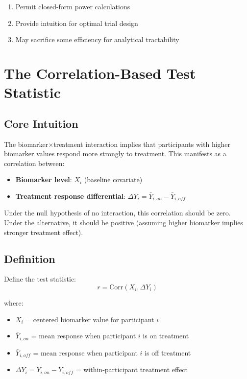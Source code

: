 \documentclass[11pt]{article}
\theoremstyle{definition}
\begin{document}
\begin{enumerate}
    \item Permit closed-form power calculations
    \item Provide intuition for optimal trial design
    \item May sacrifice some efficiency for analytical tractability
\end{enumerate}

\section{The Correlation-Based Test Statistic}

\subsection{Core Intuition}

The biomarker$\times$treatment interaction implies that participants with
higher biomarker values respond more strongly to treatment. This manifests as
a correlation between:

\begin{itemize}
    \item \textbf{Biomarker level}: $X_i$ (baseline covariate)
    \item \textbf{Treatment response differential}: $\Delta Y_i = \bar{Y}_{i,on} - \bar{Y}_{i,off}$
\end{itemize}

Under the null hypothesis of no interaction, this correlation should be zero.
Under the alternative, it should be positive (assuming higher biomarker
implies stronger treatment effect).

\subsection{Definition}

Define the test statistic:
\begin{equation}
\boxed{r = \text{Corr}(X_i, \Delta Y_i)}
\end{equation}

where:
\begin{itemize}
    \item $X_i$ = centered biomarker value for participant $i$
    \item $\bar{Y}_{i,on}$ = mean response when participant $i$ is on treatment
    \item $\bar{Y}_{i,off}$ = mean response when participant $i$ is off treatment
    \item $\Delta Y_i = \bar{Y}_{i,on} - \bar{Y}_{i,off}$ = within-participant treatment effect
\end{itemize}
\end{document}

